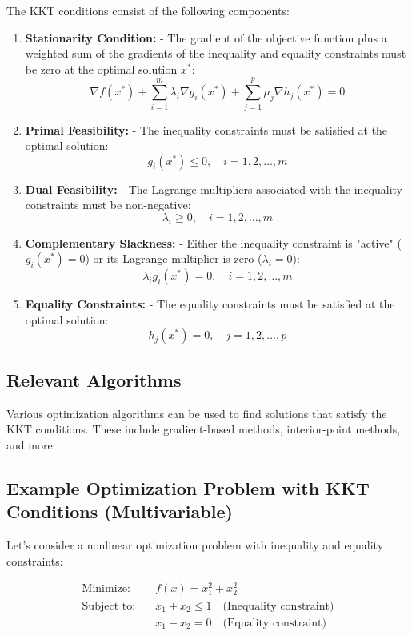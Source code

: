 \documentclass[a4paper]{article}
\begin{document}
The KKT conditions consist of the following components:

\begin{enumerate}
\item \textbf{Stationarity Condition:}
   - The gradient of the objective function plus a weighted sum of the gradients of the inequality and equality constraints must be zero at the optimal solution \(x^*\):
   \[
   \nabla f(x^*) + \sum_{i=1}^m \lambda_i \nabla g_i(x^*) + \sum_{j=1}^p \mu_j \nabla h_j(x^*) = 0
   \]

\item \textbf{Primal Feasibility:}
   - The inequality constraints must be satisfied at the optimal solution:
   \[
   g_i(x^*) \leq 0, \quad i = 1, 2, \ldots, m
   \]

\item \textbf{Dual Feasibility:}
   - The Lagrange multipliers associated with the inequality constraints must be non-negative:
   \[
   \lambda_i \geq 0, \quad i = 1, 2, \ldots, m
   \]

\item \textbf{Complementary Slackness:}
   - Either the inequality constraint is "active" (\(g_i(x^*) = 0\)) or its Lagrange multiplier is zero (\(\lambda_i = 0\)):
   \[
   \lambda_i g_i(x^*) = 0, \quad i = 1, 2, \ldots, m
   \]

\item \textbf{Equality Constraints:}
   - The equality constraints must be satisfied at the optimal solution:
   \[
   h_j(x^*) = 0, \quad j = 1, 2, \ldots, p
   \]
\end{enumerate}

\subsection{Relevant Algorithms}

Various optimization algorithms can be used to find solutions that satisfy the KKT conditions. These include gradient-based methods, interior-point methods, and more.

\subsection{Example Optimization Problem with KKT Conditions (Multivariable)}

Let's consider a nonlinear optimization problem with inequality and equality constraints:


\begin{align*}
\text{Minimize:} \quad & f(x) = x_1^2 + x_2^2 \\
\text{Subject to:} \quad & x_1 + x_2 \leq 1 \quad \text{(Inequality constraint)} \\
& x_1 - x_2 = 0 \quad \text{(Equality constraint)}
\end{align*}
\end{document}
